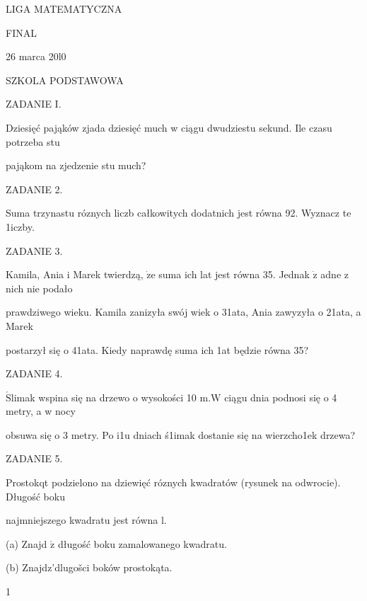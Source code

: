 \documentclass[a4paper,12pt]{article}
\begin{document}
LIGA MATEMATYCZNA

FINAL

26 marca 20l0

SZKOLA PODSTAWOWA

ZADANIE I.

Dziesięć pająków zjada dziesięć much w ciągu dwudziestu sekund. Ile czasu potrzeba stu

pająkom na zjedzenie stu much?

ZADANIE 2.

Suma trzynastu róznych liczb całkowitych dodatnich jest równa 92. Wyznacz te 1iczby.

ZADANIE 3.

Kamila, Ania i Marek twierdzą, $\dot{\mathrm{z}}\mathrm{e}$ suma ich lat jest równa 35. Jednak $\dot{\mathrm{z}}$ adne z nich nie podało

prawdziwego wieku. Kamila zanizyła swój wiek o 31ata, Ania zawyzyła o 21ata, a Marek

postarzył się o 41ata. Kiedy naprawdę suma ich 1at będzie równa 35?

ZADANIE 4.

$\acute{\mathrm{S}}$limak wspina się na drzewo o wysokości 10 $\mathrm{m}. \mathrm{W}$ ciągu dnia podnosi się o 4 metry, a w nocy

obsuwa się o 3 metry. Po i1u dniach ś1imak dostanie się na wierzcho1ek drzewa?

ZADANIE 5.

Prostokqt podzielono na dziewięć róznych kwadratów (rysunek na odwrocie). Długość boku

najmniejszego kwadratu jest równa l.

(a) Znajd $\acute{\mathrm{z}}$ długość boku zamalowanego kwadratu.

(b) Znajdz'dlugošci boków prostokąta.




1
\end{document}
